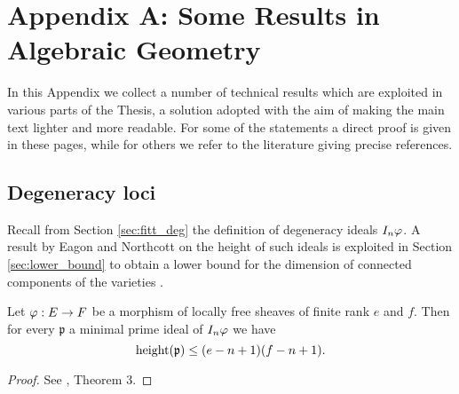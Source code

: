 
\chapter{Appendix A: Some Results in Algebraic Geometry}\label{serre_duality} %



\ifpdf
    \graphicspath{{figures/}{figures/}{figures/}}
\else
    \graphicspath{{figures/}{figures/}}
\fi


In this Appendix we collect a number of technical results which are exploited in various parts of the Thesis, a solution adopted with the aim of making the main text lighter and more readable. For some of the statements a direct proof is given in these pages, while for others we refer to the literature giving precise references.

\section{Degeneracy loci}
	
	Recall from Section \ref{sec:fitt_deg} the definition of degeneracy ideals $I_n \varphi$. A result by Eagon and Northcott on the height of such ideals is exploited in Section \ref{sec:lower_bound} to obtain a lower bound for the dimension of connected components of the varieties \modu.
	\begin{theo}\label{thm:height}
		Let $\varphi:E\to F$ be a morphism of locally free sheaves of finite rank $e$ and $f$. Then for every $\mathfrak{p}$ a minimal prime ideal of $I_n \varphi$ we have
		$$ \operatorname{height} (\mathfrak{p}) \leq (e-n+1)(f-n+1). $$
	\end{theo}
	\begin{proof}
		See \cite{NORTH}, Theorem 3.
	\end{proof}

